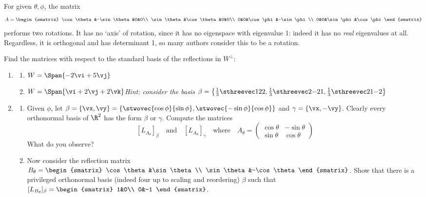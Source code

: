 \begin{example}{}{}
For given $\theta,\phi$, the matrix
\[A=\begin{smatrix}
  \cos\theta&-\sin\theta&0&0\\
  \sin\theta&\cos\theta&0&0\\
  0&0&\cos\phi&-\sin\phi\\
  0&0&\sin\phi&\cos\phi
\end{smatrix}\]
performs two rotations. It has no `axis' of rotation, since it has no eigenspace with eigenvalue 1: indeed it has no \emph{real} eigenvalues at all. Regardless, it is orthogonal and has determinant 1, so many authors consider this to be a rotation.
\end{example}

\begin{exercises}
\exstart Find the matrices with respect to the standard basis of the reflections in $W^\perp$:

\begin{enumerate}
	\item[]\begin{enumerate}
	  \item $W=\Span\{-2\vi+5\vj\}$
	  \item $W=\Span\{\vi+2\vj+2\vk\}$\quad  \emph{Hint: consider the basis $\beta=\left\{\frac 13\sthreevec 122,\frac 13\sthreevec 2{-2}1,\frac 13\sthreevec 21{-2}\right\}$}
	\end{enumerate}
	
  \item\begin{enumerate}
  	\item Given $\phi$, let $\beta=\{\vx,\vy\}=\left\{\stwovec{\cos\phi}{\sin\phi},\stwovec{-\sin\phi}{\cos\phi}\right\}$ and $\gamma=\{\vx,-\vy\}$. Clearly every orthonormal basis of $\R^2$ has the form $\beta$ or $\gamma$. Compute the matrices
  	\[[L_{A_\theta}]_\beta\quad\text{and}\quad[L_{A_\theta}]_\gamma\quad\text{where}\quad A_\theta=\begin{pmatrix}
		\cos\theta&-\sin\theta\\
		\sin\theta&\cos\theta
  	\end{pmatrix}\]
  	What do you observe?
  	\item Now consider the reflection matrix $B_\theta=\begin{smatrix}
		\cos\theta&\sin\theta\\
		\sin\theta&-\cos\theta
  	\end{smatrix}$. Show that there is a privileged orthonormal basis (indeed four up to scaling and reordering) $\beta$ such that $[L_{B_\theta}]_\beta=\begin{smatrix}
		1&0\\
		0&-1
  	\end{smatrix}$.
 	\end{enumerate}
 	

\end{enumerate}
\end{exercises}
